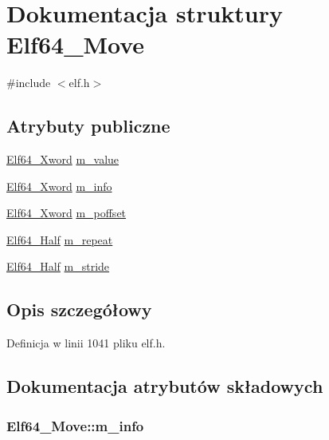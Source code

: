 \hypertarget{struct_elf64___move}{\section{Dokumentacja struktury Elf64\-\_\-\-Move}
\label{struct_elf64___move}
}


{\ttfamily \#include $<$elf.\-h$>$}

\subsection*{Atrybuty publiczne}
\begin{DoxyCompactItemize}
\item 
\hyperlink{elf_8h_a5447a48a3dae0bd24f606415268c6fe4}{Elf64\-\_\-\-Xword} \hyperlink{struct_elf64___move_ab6ef52b74b3742b569dcacc4a7f835df}{m\-\_\-value}
\item 
\hyperlink{elf_8h_a5447a48a3dae0bd24f606415268c6fe4}{Elf64\-\_\-\-Xword} \hyperlink{struct_elf64___move_a543c917c40646df01c33537a6d8b86cf}{m\-\_\-info}
\item 
\hyperlink{elf_8h_a5447a48a3dae0bd24f606415268c6fe4}{Elf64\-\_\-\-Xword} \hyperlink{struct_elf64___move_a36fe21def9afee88be6acc62e45fdeba}{m\-\_\-poffset}
\item 
\hyperlink{elf_8h_adb6a5584018b431da3472e7c6a7fd731}{Elf64\-\_\-\-Half} \hyperlink{struct_elf64___move_ab6f1c59b8b9789cdd223fa525937dbdb}{m\-\_\-repeat}
\item 
\hyperlink{elf_8h_adb6a5584018b431da3472e7c6a7fd731}{Elf64\-\_\-\-Half} \hyperlink{struct_elf64___move_ac999afc6aec249cd19ebbef408228c95}{m\-\_\-stride}
\end{DoxyCompactItemize}


\subsection{Opis szczegółowy}


Definicja w linii 1041 pliku elf.\-h.



\subsection{Dokumentacja atrybutów składowych}
\hypertarget{struct_elf64___move_a543c917c40646df01c33537a6d8b86cf}{
\subsubsection[{m\-\_\-info}]{ Elf64\-\_\-\-Move\-::m\-\_\-info}}\label{struct_elf64___move_a543c917c40646df01c33537a6d8b86cf}


